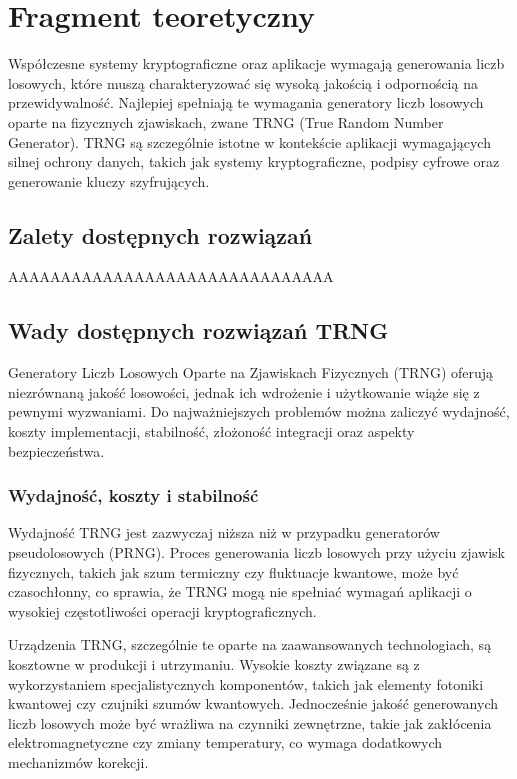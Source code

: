 \chapter{Fragment teoretyczny}

Współczesne systemy kryptograficzne oraz aplikacje wymagają generowania liczb losowych, które muszą charakteryzować się wysoką jakością i odpornością na przewidywalność. Najlepiej spełniają te wymagania generatory liczb losowych oparte na fizycznych zjawiskach, zwane TRNG (True Random Number Generator). TRNG są szczególnie istotne w kontekście aplikacji wymagających silnej ochrony danych, takich jak systemy kryptograficzne, podpisy cyfrowe oraz generowanie kluczy szyfrujących.

\section{Zalety dostępnych rozwiązań}

AAAAAAAAAAAAAAAAAAAAAAAAAAAAAAA

\section{Wady dostępnych rozwiązań TRNG}

Generatory Liczb Losowych Oparte na Zjawiskach Fizycznych (TRNG) oferują niezrównaną jakość losowości, jednak ich wdrożenie i użytkowanie wiąże się z pewnymi wyzwaniami. Do najważniejszych problemów można zaliczyć wydajność, koszty implementacji, stabilność, złożoność integracji oraz aspekty bezpieczeństwa.

\subsection{Wydajność, koszty i stabilność}

Wydajność TRNG jest zazwyczaj niższa niż w przypadku generatorów pseudolosowych (PRNG). Proces generowania liczb losowych przy użyciu zjawisk fizycznych, takich jak szum termiczny czy fluktuacje kwantowe, może być czasochłonny, co sprawia, że TRNG mogą nie spełniać wymagań aplikacji o wysokiej częstotliwości operacji kryptograficznych.

Urządzenia TRNG, szczególnie te oparte na zaawansowanych technologiach, są kosztowne w produkcji i utrzymaniu. Wysokie koszty związane są z wykorzystaniem specjalistycznych komponentów, takich jak elementy fotoniki kwantowej czy czujniki szumów kwantowych. Jednocześnie jakość generowanych liczb losowych może być wrażliwa na czynniki zewnętrzne, takie jak zakłócenia elektromagnetyczne czy zmiany temperatury, co wymaga dodatkowych mechanizmów korekcji.


